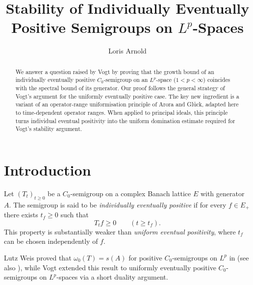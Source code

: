 \documentclass[12pt]{amsart}
\theoremstyle{plain}
\theoremstyle{definition}
\begin{document}
	
	\title{Stability of Individually Eventually Positive Semigroups on $L^p$-Spaces}
	\author[L. Arnold]{Loris Arnold}
	
	
	
	\address[L. Arnold]{Normandie Univ, UNICAEN, CNRS, LMNO, 14000 Caen, France}
	
	
	\maketitle
	
	\begin{abstract}
		We answer a question raised by Vogt by proving that the growth bound of an individually eventually positive $C_0$-semigroup on an $L^p$-space ($1 < p < \infty$) coincides with the spectral bound of its generator. Our proof follows the general strategy of Vogt's argument for the uniformly eventually positive case. The key new ingredient is a variant of an operator-range uniformisation
		principle of Arora and Gl\"uck, adapted here to time-dependent operator ranges. When applied to principal ideals, this principle turns individual eventual positivity into the uniform domination estimate required for Vogt's stability argument.
	\end{abstract}
	
	\section{Introduction}
	
	Let $(T_t)_{t\ge 0}$ be a $C_0$-semigroup on a complex Banach lattice $E$
	with generator $A$. The semigroup is said to be \emph{individually
		eventually positive} if for every $f\in E_+$ there exists $t_f\ge 0$ such
	that
	\[
	T_tf\ge 0 \qquad (t\ge t_f).
	\]
	This property is substantially weaker than \emph{uniform eventual
		positivity}, where $t_f$ can be chosen independently of $f$.
	
	
	Lutz Weis proved that $\omega_0(T)=s(A)$ for positive $C_0$-semigroups on $L^p$ in \cite{Weis95} (see also \cite{Weis98}), while Vogt \cite{Vogt} extended this result to uniformly eventually positive $C_0$-semigroups on $L^p$-spaces via a short duality argument.
	
\end{document}
